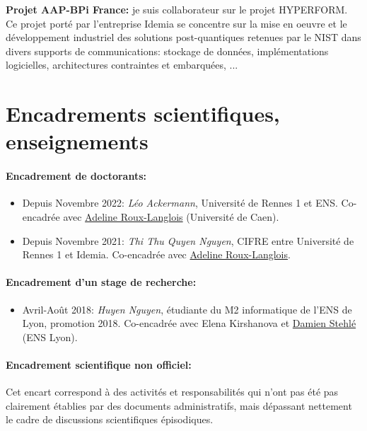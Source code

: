 \documentclass[11pt]{article}
\begin{document}
\noindent\textbf{Projet AAP-BPi France:} je suis collaborateur sur le projet HYPERFORM.\\
Ce projet porté par l'entreprise Idemia se concentre sur la mise en oeuvre et le développement industriel des solutions post-quantiques retenues par le NIST dans divers supports de communications: stockage de données, implémentations logicielles, architectures contraintes et embarquées, ...


\section{Encadrements scientifiques, enseignements}

\paragraph{Encadrement de doctorants:}
\begin{itemize}
\item Depuis Novembre 2022: \emph{Léo Ackermann}, Université de Rennes 1 et ENS. Co-encadrée avec \href{https://langloi227.users.greyc.fr/}{Adeline Roux-Langlois} (Université de Caen).
\item Depuis Novembre 2021: \emph{Thi Thu Quyen Nguyen}, CIFRE entre Université de Rennes 1 et Idemia. Co-encadrée avec \href{https://langloi227.users.greyc.fr/}{Adeline Roux-Langlois}.
\end{itemize}


\paragraph{Encadrement d'un stage de recherche:}
\begin{itemize}
\item Avril-Août 2018: {\em Huyen Nguyen}, étudiante du M2 informatique de l'ENS de Lyon, promotion 2018. Co-encadrée avec Elena Kirshanova et \href{http://perso.ens-lyon.fr/damien.stehle/}{Damien Stehlé} (ENS Lyon).
\end{itemize}

    \paragraph{Encadrement scientifique non officiel:}

    Cet encart correspond à des activités et responsabilités qui n'ont pas été pas clairement établies par des documents administratifs, mais dépassant nettement le cadre de discussions scientifiques épisodiques.
  
\end{document}

